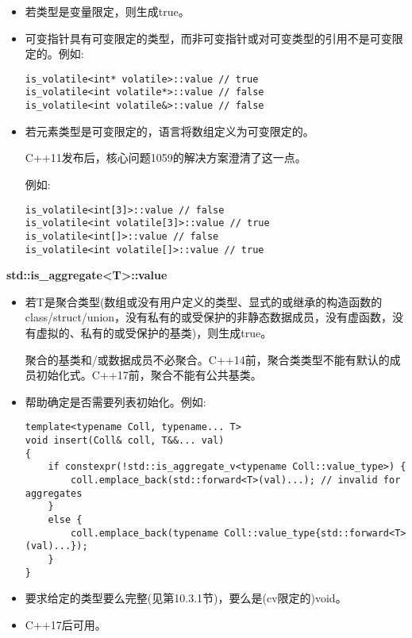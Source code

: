 \begin{itemize}
\item 
若类型是变量限定，则生成true。

\item 
可变指针具有可变限定的类型，而非可变指针或对可变类型的引用不是可变限定的。例如:

\begin{lstlisting}[style=styleCXX]
is_volatile<int* volatile>::value // true
is_volatile<int volatile*>::value // false
is_volatile<int volatile&>::value // false
\end{lstlisting}

\item 
若元素类型是可变限定的，语言将数组定义为可变限定的。

\begin{tcolorbox}[colback=webgreen!5!white,colframe=webgreen!75!black]
\hspace*{0.75cm}C++11发布后，核心问题1059的解决方案澄清了这一点。
\end{tcolorbox}

例如:
\begin{lstlisting}[style=styleCXX]
is_volatile<int[3]>::value // false
is_volatile<int volatile[3]>::value // true
is_volatile<int[]>::value // false
is_volatile<int volatile[]>::value // true
\end{lstlisting}
\end{itemize}

\textbf{std::is\_aggregate<T>::value}

\begin{itemize}
\item 
若T是聚合类型(数组或没有用户定义的类型、显式的或继承的构造函数的class/struct/union，没有私有的或受保护的非静态数据成员，没有虚函数，没有虚拟的、私有的或受保护的基类)，则生成true。

\begin{tcolorbox}[colback=webgreen!5!white,colframe=webgreen!75!black]
\hspace*{0.75cm}聚合的基类和/或数据成员不必聚合。C++14前，聚合类类型不能有默认的成员初始化式。C++17前，聚合不能有公共基类。
\end{tcolorbox}

\item 
帮助确定是否需要列表初始化。例如:
\begin{lstlisting}[style=styleCXX]
template<typename Coll, typename... T>
void insert(Coll& coll, T&&... val)
{
	if constexpr(!std::is_aggregate_v<typename Coll::value_type>) {
		coll.emplace_back(std::forward<T>(val)...); // invalid for aggregates
	}
	else {
		coll.emplace_back(typename Coll::value_type{std::forward<T>(val)...});
	}
}
\end{lstlisting}

\item 
要求给定的类型要么完整(见第10.3.1节)，要么是(cv限定的)void。

\item 
C++17后可用。
\end{itemize}

